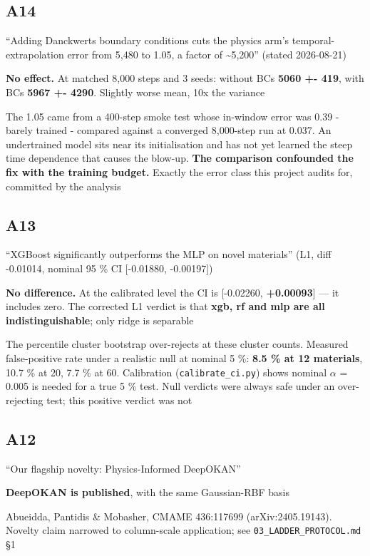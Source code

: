 \documentclass[10pt]{article}
\begin{document}
\subsection*{A14}\label{led:A14}
\begin{description}[leftmargin=0pt,itemsep=1pt]
\item[Claim withdrawn.] ``Adding Danckwerts boundary conditions cuts the physics arm's temporal-extrapolation error from 5,480 to 1.05, a factor of \textasciitilde{}5,200'' (stated 2026-08-21)
\item[Replaced with.] \textbf{No effect.} At matched 8,000 steps and 3 seeds: without BCs \textbf{5060 +- 419}, with BCs \textbf{5967 +- 4290}. Slightly worse mean, 10x the variance
\item[Why it was wrong.] The 1.05 came from a 400-step smoke test whose in-window error was 0.39 - barely trained - compared against a converged 8,000-step run at 0.037. An undertrained model sits near its initialisation and has not yet learned the steep time dependence that causes the blow-up. \textbf{The comparison confounded the fix with the training budget.} Exactly the error class this project audits for, committed by the analysis
\end{description}
\subsection*{A13}\label{led:A13}
\begin{description}[leftmargin=0pt,itemsep=1pt]
\item[Claim withdrawn.] ``XGBoost significantly outperforms the MLP on novel materials'' (L1, diff -0.01014, nominal 95 \% CI [-0.01880, -0.00197])
\item[Replaced with.] \textbf{No difference.} At the calibrated level the CI is [-0.02260, \textbf{+0.00093}] --- it includes zero. The corrected L1 verdict is that \textbf{xgb, rf and mlp are all indistinguishable}; only ridge is separable
\item[Why it was wrong.] The percentile cluster bootstrap over-rejects at these cluster counts. Measured false-positive rate under a realistic null at nominal 5 \%: \textbf{8.5 \% at 12 materials}, 10.7 \% at 20, 7.7 \% at 60. Calibration (\texttt{calibrate\_ci.py}) shows nominal $\alpha$ = 0.005 is needed for a true 5 \% test. Null verdicts were always safe under an over-rejecting test; this positive verdict was not
\end{description}
\subsection*{A12}\label{led:A12}
\begin{description}[leftmargin=0pt,itemsep=1pt]
\item[Claim withdrawn.] ``Our flagship novelty: Physics-Informed DeepOKAN''
\item[Replaced with.] \textbf{DeepOKAN is published}, with the same Gaussian-RBF basis
\item[Why it was wrong.] Abueidda, Pantidis \& Mobasher, CMAME 436:117699 (arXiv:2405.19143). Novelty claim narrowed to column-scale application; see \texttt{03\_LADDER\_PROTOCOL.md} §1
\end{description}
\end{document}
